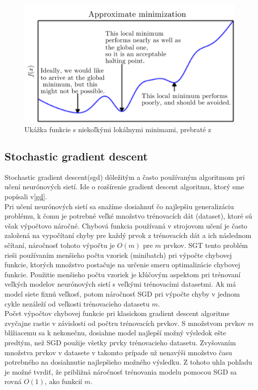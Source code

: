 \begin{figure}[H]
	\centering
	\includegraphics[width=0.75\linewidth]{img/gdglobalmin}
	\caption{Ukážka funkcie s niekoľkými lokálnymi minimami, prebraté z\cite[s.~85]{goodfellow2016deep}}
	\label{fig:gd_global_min}
\end{figure}

\subsection{Stochastic gradient descent} \label{l:sgt}
Stochastic gradient descent(\acrshort{sgd}) dôležitým a často používaným algoritmom pri učení neurónových sietí.
Ide o rozšírenie gradient descent algoritmu, ktorý sme popísali v\ref{gd}.\cite{goodfellow2016deep} \\

\indent Pri učení neurónových sietí sa snažíme dosiahnuť čo najlepšiu generalizáciu problému, k čomu je potrebné veľké množstvo trénovacích dát (dataset), ktoré sú však výpočtovo náročné.
Chybová funkcia používaná v strojovom učení je často založená na vypočítaní chyby pre každý prvok z trénovacích dát a ich následnom sčítaní, náročnosť tohoto výpočtu je $O(m)$ pre $m$ prvkov.
SGT tento problém rieši používaním menšieho počtu vzoriek (minibatch) pri výpočte chybovej funkcie, ktorých množstvo postačuje na určenie smeru optimalizácie chybovej funkcie. 
Použitie menšieho počtu vzoriek je kľúčovým aspektom pri trénovaní veľkých modelov neurónových sietí s veľkými trénovacími datasetmi.
Ak má model siete fixnú veľkosť, potom náročnosť SGD pri výpočte chyby v jednom cykle nezáleží od veľkosti trénovacieho datasetu $m$. \\

\indent Počet výpočtov chybovej funkcie pri klasickom gradient descent algoritme zvyčajne rastie v závislosti od počtru trénovacích prvkov.
S množstvom prvkov $m$ blížiacemu sa k nekonečnu, dosiahne model najlepší možný výsledok ešte predtým, než SGD použije všetky prvky trénovacieho datasetu.
Zvyšovaním množstva prvkov v datasete v takomto prípade už nenavýši množstvo času potrebného na dosiahnutie najlepšieho možného výsledku.
Z tohoto uhla pohľadu je možné tvrdiť, že približná náročnosť trénovania modelu pomocou SGD sa rovná $O(1)$, ako funkcií $m$.\cite{goodfellow2016deep}

